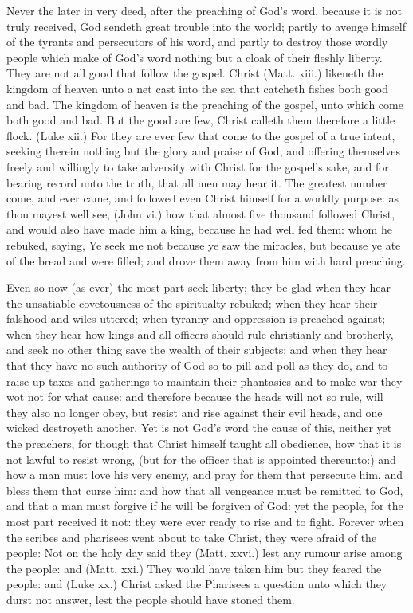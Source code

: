 Never the later in very deed, after the preaching of 
God's word, because it is not truly received, God sendeth 
great trouble into the world; partly to avenge himself of 
the tyrants and persecutors of his word, and partly to destroy
those wordly people which make of God's word nothing
but a cloak of their fleshly liberty. They are not 
all good that follow the gospel. Christ (Matt. xiii.) likeneth 
the kingdom of heaven unto a net cast into the sea that 
catcheth fishes both good and bad. The kingdom of 
heaven is the preaching of the gospel, unto which come 
both good and bad. But the good are few, Christ 
calleth them therefore a little flock. (Luke xii.) For they 
are ever few that come to the gospel of a true intent,
seeking therein nothing but the glory and praise of God,
and offering themselves freely and willingly to take adversity
with Christ for the gospel's sake, and for bearing 
record unto the truth, that all men may hear it. The 
greatest number come, and ever came, and followed even 
Christ himself for a worldly purpose: as thou mayest well 
see, (John vi.) how that almost five thousand followed 
Christ, and would also have made him a king, because he 
had well fed them: whom he rebuked, saying, Ye seek me 
not because ye saw the miracles, but because ye ate of the 
bread and were filled; and drove them away from him with 
hard preaching.

Even so now (as ever) the most part seek liberty; they 
be glad when they hear the unsatiable covetousness of the 
spiritualty rebuked; when they hear their falshood and 
wiles uttered; when tyranny and oppression is preached 
against; when they hear how kings and all officers should 
rule christianly and brotherly, and seek no other thing save 
the wealth of their subjects; and when they hear that they 
have no such authority of God so to pill and poll as they
do, and to raise up taxes and gatherings to maintain their 
phantasies and to make war they wot not for what cause:
and therefore because the heads will not so rule, will they 
also no longer obey, but resist and rise against their evil 
heads, and one wicked destroyeth another. Yet is not 
God's word the cause of this, neither yet the preachers, 
for though that Christ himself taught all obedience, how 
that it is not lawful to resist wrong, (but for the officer that 
is appointed thereunto:) and how a man must love his very 
enemy, and pray for them that persecute him, and bless 
them that curse him: and how that all vengeance must be 
remitted to God, and that a man must forgive if he will be 
forgiven of God: yet the people, for the most part received
it not: they were ever ready to rise and to fight.
Forever when the scribes and pharisees went about to take 
Christ, they were afraid of the people: Not on the holy 
day said they (Matt. xxvi.) lest any rumour arise among 
the people: and (Matt. xxi.) They would have taken him 
but they feared the people: and (Luke xx.) Christ asked 
the Pharisees a question unto which they durst not answer,
lest the people should have stoned them. 

